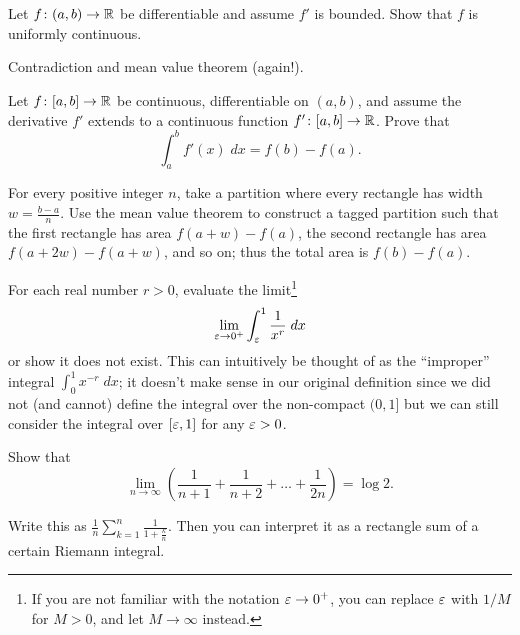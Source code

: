 \section{\problemhead}
\begin{problem}
	Let $f \colon (a,b) \to \mathbb R$ be differentiable
	and assume $f'$ is bounded.
	Show that $f$ is uniformly continuous.
	\begin{hint}
		Contradiction and mean value theorem (again!).
	\end{hint}
\end{problem}

\begin{sproblem}
	\label{thm:FTC}
	Let $f \colon [a,b] \to \mathbb R$ be continuous,
	differentiable on $(a,b)$,
	and assume the derivative $f'$ extends to a
	continuous function $f' \colon [a,b] \to \mathbb R$.
	Prove that
	\[ \int_a^b f'(x) \; dx = f(b) - f(a). \]
	\begin{hint}
		For every positive integer $n$,
		take a partition where every rectangle has width $w = \frac{b-a}{n}$.
		Use the mean value theorem to construct a tagged partition
		such that the first rectangle has area $f(a+w)-f(a)$,
		the second rectangle has area $f(a+2w) - f(a+w)$, and so on;
		thus the total area is $f(b) - f(a)$.
	\end{hint}
\end{sproblem}

\begin{problem}
	For each real number $r > 0$,
	evaluate the limit\footnote{If you are not
		familiar with the notation $\varepsilon \to 0^+$,
		you can replace $\varepsilon$ with $1/M$ for $M > 0$,
		and let $M \to \infty$ instead.}
	\[ \lim_{\varepsilon \to 0^+} \int_\varepsilon^1 \frac{1}{x^r} \; dx \]
	or show it does not exist.
	This can intuitively be thought of as
	the ``improper'' integral $\int_0^1 x^{-r} \; dx$;
	it doesn't make sense in our original definition since
	we did not (and cannot) define the integral
	over the non-compact $(0,1]$ %
	but we can still consider the integral over $[\varepsilon,1]$
	for any $\varepsilon > 0$.
\end{problem}

\begin{problem}
	Show that
	\[ \lim_{n \to \infty}
		\left( \frac{1}{n+1} + \frac{1}{n+2} + \dots + \frac{1}{2n} \right)
		= \log 2.  \]
	\begin{hint}
		Write this as $\frac1n \sum_{k=1}^n \frac{1}{1+\frac kn}$.
		Then you can interpret it as a rectangle sum
		of a certain Riemann integral.
	\end{hint}
\end{problem}

